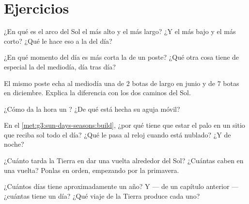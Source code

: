 \section{Ejercicios}

\begin{exercise}[$\star$]\label{exo:g3:sun-days-seasons:1}
¿En qué  es el arco del Sol el más alto y el más largo? ¿Y
el más bajo y el más corto? ¿Qué le hace eso a la  del día?
\end{exercise}

\begin{exercise}[$\star$]\label{exo:g3:sun-days-seasons:2}
¿En qué momento del día es más corta la  de un poste? ¿Qué otra
cosa tiene de especial la  del mediodía, día tras día?
\end{exercise}

\begin{exercise}[$\star$]\label{exo:g3:sun-days-seasons:3}
El mismo poste echa al mediodía una  de $2$ botas de largo en
junio y de $7$ botas en diciembre. Explica la diferencia con los dos
caminos del Sol.
\end{exercise}

\begin{exercise}[$\star$]\label{exo:g3:sun-days-seasons:4}
¿Cómo da la hora un ? ¿De qué está hecha su aguja móvil?
\end{exercise}

\begin{exercise}[$\star$]\label{exo:g3:sun-days-seasons:5}
En el \cref{met:g3:sun-days-seasons:build}, ¿por qué tiene que estar
el palo en un sitio que reciba sol todo el día? ¿Qué le pasa al reloj
cuando está nublado? ¿Y de noche?
\end{exercise}

\begin{exercise}[$\star$]\label{exo:g3:sun-days-seasons:6}
¿Cuánto tarda la Tierra en dar una vuelta alrededor del Sol? ¿Cuántas
 caben en una vuelta? Ponlas en orden, empezando por la
primavera.
\end{exercise}

\begin{exercise}[$\star$]\label{exo:g3:sun-days-seasons:7}
¿Cuántos días tiene aproximadamente un año? Y --- de un capítulo
anterior --- ¿cuántas  tiene un día? ¿Qué viaje de la Tierra
produce cada uno?
\end{exercise}

